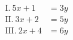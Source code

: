 \documentclass[preview]{standalone}
\begin{document}
\begin{align*}
\text{I.}~ 5x + 1 &= 3y\\ \text{II.}~ 3x+2 &= 5y \\ \text{III.}~ 2x+4 &= 6y
\end{align*}
\end{document}
